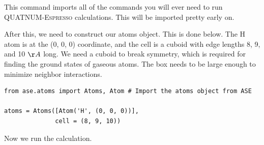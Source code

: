 \documentclass[colorlinks=true,urlcolor=blue,linkcolor=blue,citecolor=red]{article}
\begin{document}
This command imports all of the commands you will ever need to run \textsc{QUATNUM-Espresso} calculations. This will be imported pretty early on.

After this, we need to construct our atoms object. This is done below. The H atom is at the (0, 0, 0) coordinate, and the cell is a cuboid with edge lengths 8, 9, and 10 $\AA$ long. We need a cuboid to break symmetry, which is required for finding the ground states of gaseous atoms. The box needs to be large enough to minimize neighbor interactions.

\begin{verbatim}
from ase.atoms import Atoms, Atom # Import the atoms object from ASE

atoms = Atoms([Atom('H', (0, 0, 0))],
              cell = (8, 9, 10))
\end{verbatim}

Now we run the calculation.
\end{document}
